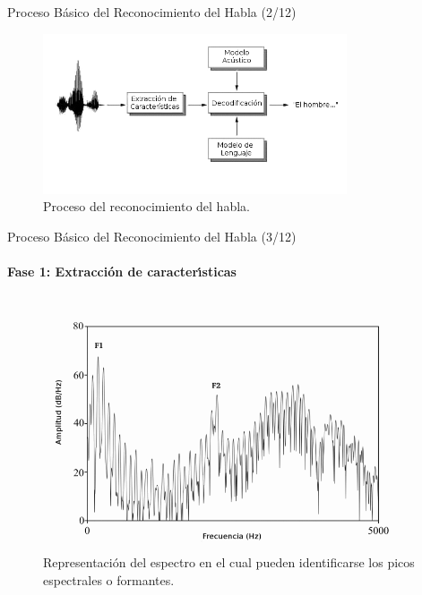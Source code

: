 \begin{frame}{Proceso B\'asico del Reconocimiento del Habla (2/12)}

\begin{figure}[H] 
\centering
\includegraphics[width=0.8\textwidth]{./graphics/proceso.png}
\caption{Proceso del reconocimiento del habla.}
\label{figure:proceso}
\end{figure}
\end{frame}


\begin{frame}{Proceso B\'asico del Reconocimiento del Habla (3/12)}
\framesubtitle{Fase 1: Extracci\'on de caracter{\'\i}sticas}
\begin{figure}[H]
\centering
\includegraphics[width=1\linewidth]{./graphics/formantes.png}
\caption{Representaci\'on del espectro en el cual pueden identificarse los picos espectrales o formantes.}
\label{figure:formants}
\end{figure}
\end{frame}

